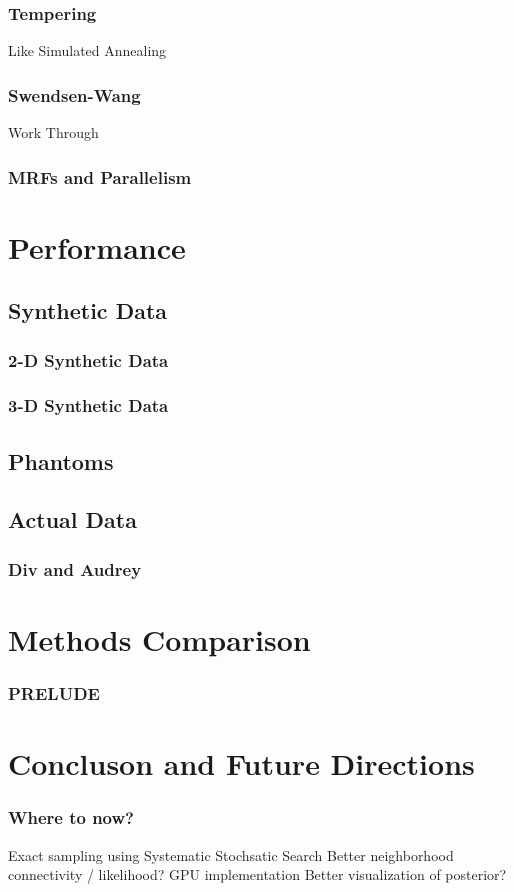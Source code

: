 \documentclass{beamer}
\begin{document}
\begin{frame}
  \frametitle{Tempering} 
  Like Simulated Annealing
\end{frame}

\begin{frame}
  \frametitle{Swendsen-Wang}
  Work Through
\end{frame}

\begin{frame}
  \frametitle{MRFs and Parallelism}
\end{frame}

\section{Performance}

\subsection{Synthetic Data}
\begin{frame}
  \frametitle{2-D Synthetic Data}
\end{frame}

\begin{frame}
  \frametitle{3-D Synthetic Data}
\end{frame}

\subsection{Phantoms}

\subsection{Actual Data}
\begin{frame}
  \frametitle{Div and Audrey}
\end{frame}

\section{Methods Comparison}
\begin{frame}
  \frametitle{PRELUDE}
\end{frame}

\section{Concluson and Future Directions}
\begin{frame}
  \frametitle{Where to now?}
  Exact sampling using Systematic Stochsatic Search
  Better neighborhood connectivity / likelihood? 
  GPU implementation 
  Better visualization of posterior?
\end{frame}
\end{document}
